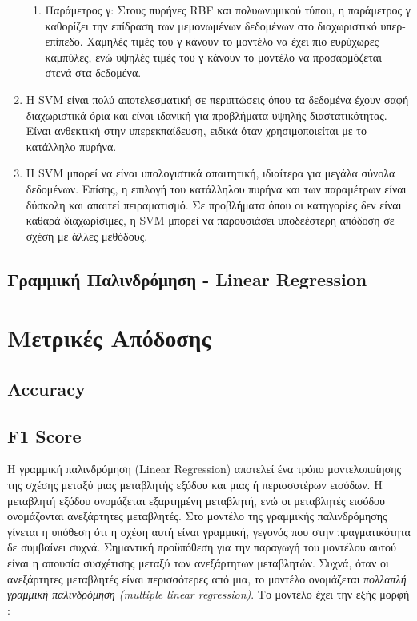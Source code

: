 \documentclass[diploma]{softlab-thesis}
\begin{document}
\begin{enumerate}
\begin{enumerate}
\item Παράμετρος γ: Στους πυρήνες RBF και πολυωνυμικού τύπου, η παράμετρος γ καθορίζει την επίδραση των μεμονωμένων δεδομένων στο διαχωριστικό υπερ-επίπεδο. Χαμηλές τιμές του γ κάνουν το μοντέλο να έχει πιο ευρύχωρες καμπύλες, ενώ υψηλές τιμές του γ κάνουν το μοντέλο να προσαρμόζεται στενά στα δεδομένα.
\end{enumerate}
\item Η SVM είναι πολύ αποτελεσματική σε περιπτώσεις όπου τα δεδομένα έχουν σαφή διαχωριστικά όρια και είναι ιδανική για προβλήματα υψηλής διαστατικότητας. Είναι ανθεκτική στην υπερεκπαίδευση, ειδικά όταν χρησιμοποιείται με το κατάλληλο πυρήνα.
\item Η SVM μπορεί να είναι υπολογιστικά απαιτητική, ιδιαίτερα για μεγάλα σύνολα δεδομένων. Επίσης, η επιλογή του κατάλληλου πυρήνα και των παραμέτρων είναι δύσκολη και απαιτεί πειραματισμό. Σε προβλήματα όπου οι κατηγορίες δεν είναι καθαρά διαχωρίσιμες, η SVM μπορεί να παρουσιάσει υποδεέστερη απόδοση σε σχέση με άλλες μεθόδους.
\end{enumerate}

\subsection{Γραμμική Παλινδρόμηση - Linear Regression}

\section{Μετρικές Απόδοσης}

\subsection{Accuracy}

\subsection{F1 Score}


Η γραμμική παλινδρόμηση (Linear Regression) αποτελεί ένα τρόπο μοντελοποίησης της σχέσης μεταξύ μιας μεταβλητής εξόδου και μιας ή περισσοτέρων εισόδων. Η μεταβλητή εξόδου ονομάζεται εξαρτημένη μεταβλητή, ενώ οι μεταβλητές εισόδου ονομάζονται ανεξάρτητες μεταβλητές. Στο μοντέλο της γραμμικής παλινδρόμησης γίνεται η υπόθεση ότι η σχέση αυτή είναι γραμμική, γεγονός που στην πραγματικότητα δε συμβαίνει συχνά.
Σημαντική προϋπόθεση για την παραγωγή του μοντέλου αυτού είναι η απουσία συσχέτισης μεταξύ των ανεξάρτητων μεταβλητών. Συχνά, όταν οι ανεξάρτητες μεταβλητές είναι περισσότερες από μια, το μοντέλο ονομάζεται \textit{πολλαπλή γραμμική παλινδρόμηση (multiple linear regression)}. Το μοντέλο έχει την εξής μορφή : \vspace{1cm}
\end{document}

